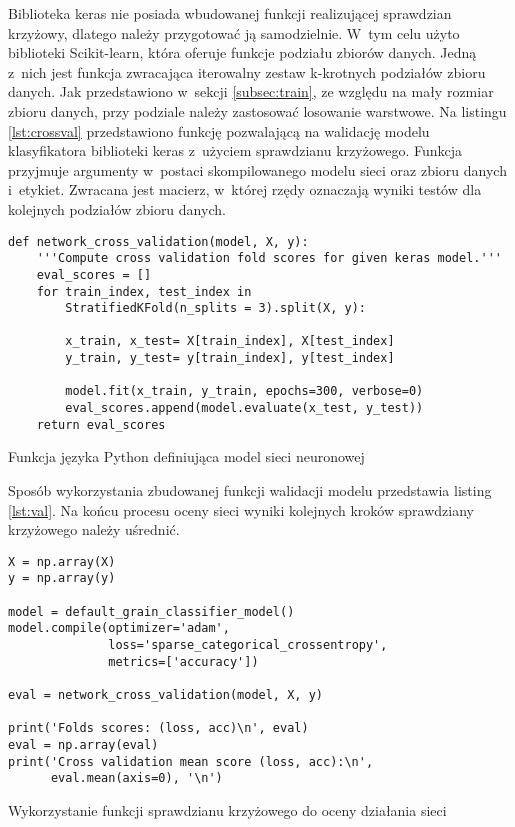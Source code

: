 Biblioteka keras nie posiada wbudowanej funkcji realizującej sprawdzian
krzyżowy, dlatego należy przygotować ją samodzielnie.
W~tym celu użyto biblioteki Scikit-learn, która oferuje funkcje podziału
zbiorów danych.
Jedną z~nich jest funkcja zwracająca iterowalny zestaw k-krotnych
podziałów zbioru danych.
Jak przedstawiono w~sekcji \ref{subsec:train}, ze względu na mały rozmiar
zbioru danych, przy podziale należy zastosować losowanie warstwowe.
Na listingu \ref{lst:crossval} przedstawiono funkcję pozwalającą na walidację
modelu klasyfikatora biblioteki keras z~użyciem sprawdzianu krzyżowego.
Funkcja przyjmuje argumenty w~postaci skompilowanego modelu sieci oraz
zbioru danych i~etykiet.
Zwracana jest macierz, w~której rzędy oznaczają wyniki testów dla kolejnych
podziałów zbioru danych.
\begin{listing}[htbp]
\begin{verbatim}
def network_cross_validation(model, X, y):
    '''Compute cross validation fold scores for given keras model.'''
    eval_scores = []
    for train_index, test_index in 
        StratifiedKFold(n_splits = 3).split(X, y):
        
        x_train, x_test= X[train_index], X[test_index]
        y_train, y_test= y[train_index], y[test_index]
        
        model.fit(x_train, y_train, epochs=300, verbose=0)
        eval_scores.append(model.evaluate(x_test, y_test))
    return eval_scores
\end{verbatim}
\caption{Funkcja języka Python definiująca model sieci neuronowej}
\label{lst:crossval}
\end{listing}
Sposób wykorzystania zbudowanej funkcji walidacji modelu przedstawia
listing \ref{lst:val}.
Na końcu procesu oceny sieci wyniki kolejnych kroków sprawdziany krzyżowego
należy uśrednić.

\begin{listing}[htbp]
\begin{verbatim}
X = np.array(X)
y = np.array(y)

model = default_grain_classifier_model()
model.compile(optimizer='adam',
              loss='sparse_categorical_crossentropy',
              metrics=['accuracy'])

eval = network_cross_validation(model, X, y)

print('Folds scores: (loss, acc)\n', eval)
eval = np.array(eval)
print('Cross validation mean score (loss, acc):\n',
      eval.mean(axis=0), '\n')
\end{verbatim}
\caption{Wykorzystanie funkcji sprawdzianu krzyżowego do oceny działania
         sieci}
\label{lst:val}
\end{listing}

